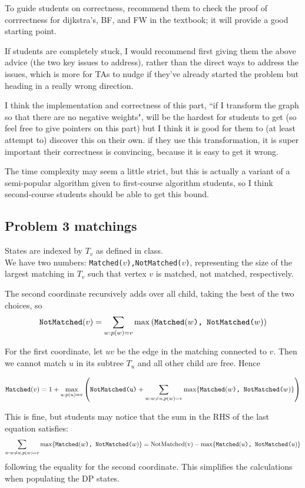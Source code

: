 \documentclass{article}
\begin{document}
To guide students on correctness, recommend them to check the proof of corrrectness for dijkstra's, BF, and FW in the textbook; it will provide a good starting point. 


\vspace{2mm}
If students are completely stuck, I would recommend first giving them the above advice (the two key issues to address), rather than the direct ways to address the issues, which is more for TAs to nudge if they've already started the problem but heading in a really wrong direction.

\vspace{2mm}I think the implementation and correctness of this part, ``if I transform the graph so that there are no negative weights", will be the hardest for students to get (so feel free to give pointers on this part) but I think it is good for them to (at least attempt to) discover this on their own. if they use this transformation, it is super important their correctness is convincing, because it is easy to get it wrong.

\vspace{2mm}
The time complexity may seem a little strict, but this is actually a variant of a semi-popular algorithm given to first-course algorithm students, so I think second-course students should be able to get this bound.

\subsection*{Problem 3 matchings}

States are indexed by $T_v$ as defined in class.\\

We have two numbers: {\tt Matched($v$),NotMatched($v$)}, representing the size of the largest matching in $T_v$ such that vertex $v$ is matched, not matched, respectively.

The second coordinate recursively adds over all child, taking the best of the two choices, so
\[
\text{{\tt NotMatched$(v)$}}= \sum_{w: p(w)=v} \max\left(\text{{\tt Matched$(w$), NotMatched($w)$}}\right)
\]

For the first coordinate, let $uv$ be the edge in the matching connected to $v$. Then we cannot match $u$ in its subtree $T_u$ and all other child are free. Hence

\[
\text{{\tt Matched$(v)$}}=1+ \max_{u: p(u)=v} \left(\text{\tt NotMatched(u)}+\sum_{w: w\neq u, p(w)=v} \max\{\text{{\tt Matched$(w$), NotMatched($w)$}}\}\right)
\]

This is fine, but students may notice that the sum in the RHS of the last equation satisfies:
\[
\sum_{w: w\neq u, p(w)=v} \max\{\text{{\tt Matched$(w$), NotMatched($w)$}}\} = \text{NotMatched(v)}- \max\{\text{{\tt Matched$(u$), NotMatched($u)$}}\}
\]
following the equality for the second coordinate. This simplifies the calculations when populating the DP states.
\end{document}
